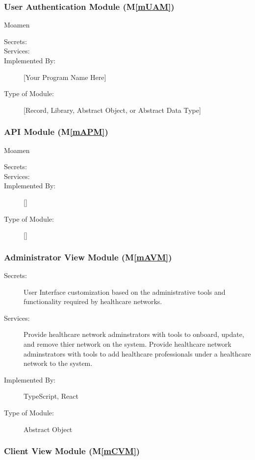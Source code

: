 \documentclass[12pt, titlepage]{article}
\newcommand{\mref}[1]{M\ref{#1}}
\begin{document}
\subsubsection{User Authentication Module (\mref{mUAM})} Moamen

\begin{description}
\item[Secrets:]
\item[Services:]
\item[Implemented By:] [Your Program Name Here]
\item[Type of Module:] [Record, Library, Abstract Object, or Abstract Data Type]
  
\end{description}

\subsubsection{API Module (\mref{mAPM})} Moamen

\begin{description}
\item[Secrets:]
\item[Services:]
\item[Implemented By:] []
\item[Type of Module:] []
\end{description}

\subsubsection{Administrator View Module (\mref{mAVM})}

\begin{description}
\item[Secrets:]User Interface customization based on the administrative tools and functionality required by healthcare networks.
\item[Services:]Provide healthcare network adminstrators with tools to onboard, update, and remove thier network on the system. Provide healthcare network adminstrators with tools to add healthcare professionals under a healthcare network to the system.
\item[Implemented By:]TypeScript, React
\item[Type of Module:]Abstract Object
\end{description}

\subsubsection{Client View Module (\mref{mCVM})}
\end{document}
